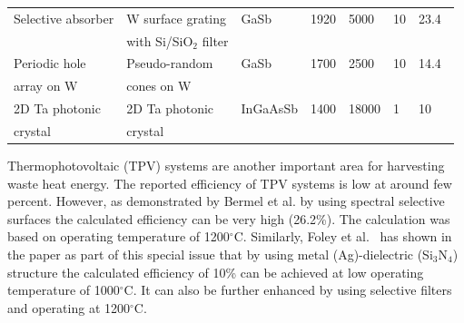 \documentclass[review]{elsarticle}
\begin{document}
{\begin{table}
\begin{center}
\begin{tabular}{|lllllll|}
		Selective absorber	& W surface grating & GaSb & 1920 & 5000 & 10 & 23.4~\cite{paper2_ref6} \\
		& with Si/SiO$_2$ filter &&&&&\\
		Periodic hole &	Pseudo-random & GaSb	& 1700 & 2500 & 10 &	14.4~\cite{me_thesis}\\	
		array on W	& cones on W&&&&&\\	
		2D Ta photonic & 2D Ta photonic & InGaAsSb & 1400 & 18000 & 1 & 10~\cite{NYL_SEMSC_2014}\\
		crystal& crystal &&&&&\\
		\hline
		\end{tabular}
	\end{center}
\end{table}
}
Thermophotovoltaic (TPV) systems are another important area for harvesting waste heat energy. The reported efficiency of TPV systems is low at around few percent. However, as demonstrated by Bermel et al. \cite{g4} by using spectral selective surfaces the calculated efficiency can be  very high (26.2\%). The calculation was based on operating temperature of 1200$^\circ$C. Similarly, Foley et al.~\cite{FUS_OptExp_2015} has shown in the paper as part of this special issue that by using metal (Ag)-dielectric (Si$_3$N$_4$) structure the calculated  efficiency of 10\% can be achieved at low operating temperature of 1000$^{\circ}$C.  It can also be further enhanced by using selective filters and operating at 1200$^\circ$C. 
\end{document}
